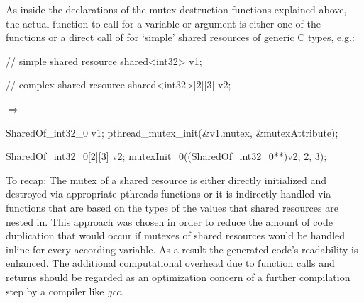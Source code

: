 As inside the declarations of the mutex destruction functions explained above, the actual function to call for a variable or argument is either one of the  functions or a direct call of  for `simple' shared resources of generic C types, e.g.:
\begin{center}
\begin{minipage}{0.3\textwidth}
\begin{ccode}
// simple shared resource
shared<int32> v1;

// complex shared resource
shared<int32>[2][3] v2;
\end{ccode}
\end{minipage}
\qquad$\Longrightarrow$\qquad\qquad
\begin{minipage}{0.4\textwidth}
\begin{ccode}
SharedOf_int32_0 v1;
pthread_mutex_init(&v1.mutex, &mutexAttribute);

SharedOf_int32_0[2][3] v2;
mutexInit_0((SharedOf_int32_0**)v2, 2, 3);
\end{ccode}
\end{minipage}
\end{center}

To recap: The mutex of a shared resource is either directly initialized and destroyed via appropriate pthreads functions or it is indirectly handled via functions that are based on the types of the values that shared resources are nested in. This approach was chosen in order to reduce the amount of code duplication that would occur if mutexes of shared resources would be handled inline for every according variable. As a result the generated code's readability is enhanced. The additional computational overhead due to function calls and returns should be regarded as an optimization concern of a further compilation step by a compiler like \textit{gcc}.

